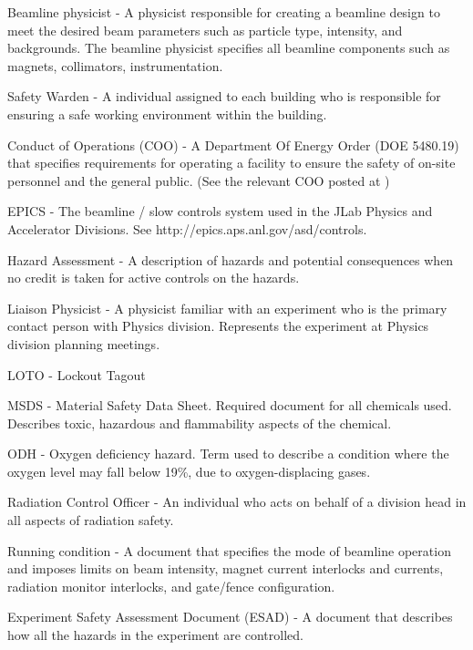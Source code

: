 %
%
\begin{description}
\item{Beamline physicist} - A physicist responsible for creating a beamline design
to meet the desired
beam parameters such as particle type, intensity, and backgrounds. The
beamline physicist
specifies all beamline components such as magnets, collimators, instrumentation.

\item{Safety Warden} - A individual assigned to each building who is responsible
for ensuring a safe
working environment within the building.

\item{Conduct of Operations (COO)} - A Department Of Energy Order (DOE 5480.19)
that specifies
requirements for operating a facility to ensure the safety of on-site
personnel and the general
public. (See the relevant COO posted at 
)

\item{EPICS} - The beamline / slow controls system used in the JLab Physics and
Accelerator
Divisions. See 
{http://epics.aps.anl.gov/asd/controls}.

\item{Hazard Assessment} - A description of hazards and potential consequences
when no credit is
taken for active controls on the hazards.

\item{Liaison Physicist} - A physicist familiar with an experiment who is the
primary contact person
with Physics division. Represents the experiment at Physics division
planning meetings.

\item{LOTO} -  Lockout Tagout

\item{MSDS} - Material Safety Data Sheet. Required document for all chemicals
used. Describes
toxic, hazardous and flammability aspects of the chemical.

\item{ODH} - Oxygen deficiency hazard. Term used to describe a condition where the
oxygen level
may fall below 19\%, due to oxygen-displacing gases.

\item{Radiation Control Officer}  - An individual who acts on behalf of a division
head in all aspects of radiation safety.

\item{Running condition} - A document that specifies the mode of beamline
operation and imposes
limits on beam intensity, magnet current interlocks and currents, radiation
monitor interlocks,
and gate/fence configuration.

\item{Experiment Safety Assessment Document (ESAD)} - A document that describes how all the
hazards in the
experiment are controlled.
\end{description}

